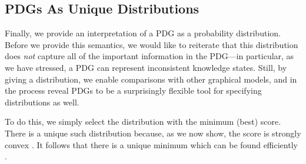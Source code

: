 \documentclass{article}
\theoremstyle{plain}
\theoremstyle{definition}
\theoremstyle{remark}
\newcommand{\todo}[1]{{\color{red}\ \!\Large\smash{\textbf{[}}{\normalsize\textsc{todo:} #1}\ \!\smash{\textbf{]}}}}
\numberwithin{equation}{section}
\begin{document}
    \subsection{PDGs As Unique Distributions}\label{sec:uniq-dist-semantics}
    Finally, we provide an interpretation of a PDG as a probability distribution.  
    Before we provide this semantics, we would like to reiterate that
    this distribution does \emph{not} capture all of the important
    information in the PDG---in particular, as we have stressed, a PDG
    can represent inconsistent knowledge states. 
	Still,
	by giving a distribution, we enable comparisons with other graphical models,
	and in the process reveal PDGs to be a surprisingly flexible tool for specifying distributions as well.
	
	To do this, we
	simply select the distribution with the 
	minimum (best)	%
    score.  There is a unique such distribution because, as we now
    show, the score is strongly convex%
	. It follows that there is a unique minimum \cite{Rockafellar1970ConvexA}
 	which can be found efficiently \cite{strongconvexopt}.
\end{document}
